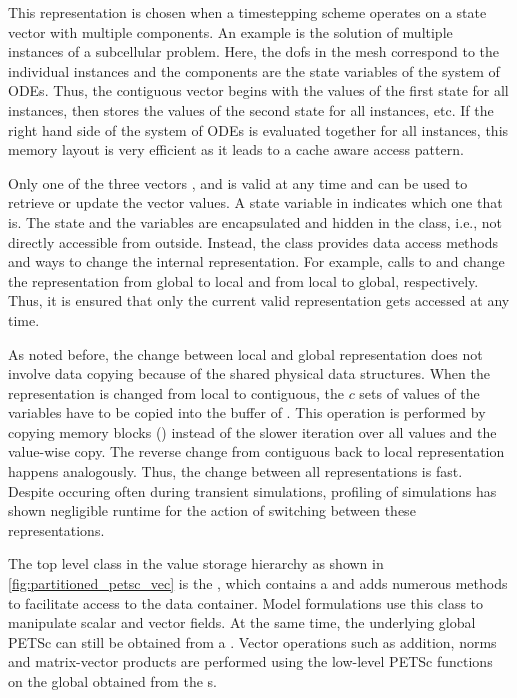 This representation is chosen when a timestepping scheme operates on a state vector with multiple components. An example is the solution of multiple instances of a subcellular problem. Here, the dofs in the mesh correspond to the individual instances and the components are the state variables of the system of ODEs. Thus, the contiguous vector begins with the values of the first state for all instances, then stores the values of the second state for all instances, etc. If the right hand side of the system of ODEs is evaluated together for all instances, this memory layout is very efficient as it leads to a cache aware access pattern.

Only one of the three vectors ,  and  is valid at any time and can be used to retrieve or update the vector values. 
A state variable  in  indicates which one that is. The state and the \Vec{} variables are encapsulated and hidden in the class, i.e., not directly accessible from outside. Instead, the class provides data access methods and ways to change the internal representation. For example, calls to  and  change the representation from global to local and from local to global, respectively.
Thus, it is ensured that only the current valid representation gets accessed at any time.

As noted before, the change between local and global representation does not involve data copying because of the shared physical data structures.
When the representation is changed from local to contiguous, the $c$ sets of values of the  variables have to be copied into the buffer of . This operation is performed by copying memory blocks  \mbox{()} instead of the slower iteration over all values and the value-wise copy. The reverse change from contiguous back to local representation happens analogously. Thus, the change between all representations is fast. Despite occuring often during transient simulations, profiling of simulations has shown negligible runtime for the action of switching between these representations.

The top level class in the value storage hierarchy as shown in \cref{fig:partitioned_petsc_vec} is the , which contains a  and adds numerous methods to facilitate access to the data container. Model formulations use this class to manipulate scalar and vector fields. At the same time, the underlying global PETSc \Vec{} can still be obtained from a . Vector operations such as addition, norms and matrix-vector products are performed using the low-level PETSc functions on the global \Vec{} obtained from the s.

